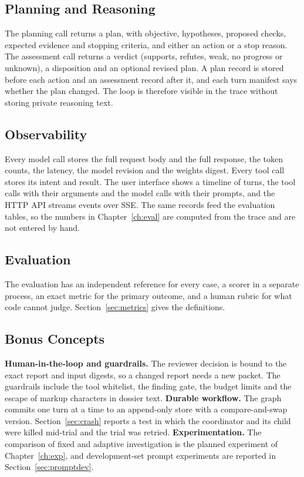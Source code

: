 \subsection{Planning and Reasoning}
The planning call returns a plan, with objective, hypotheses, proposed checks, expected evidence and
stopping criteria, and either an action or a stop reason. The assessment call returns a verdict
(supports, refutes, weak, no progress or unknown), a disposition and an optional revised plan. A plan record
is stored before each action and an assessment record after it, and each turn manifest says whether the plan
changed. The loop is therefore visible in the trace without storing private reasoning text.

\subsection{Observability}
Every model call stores the full request body and the full response, the token counts, the latency, the
model revision and the weights digest. Every tool call stores its intent and result. The user interface shows
a timeline of turns, the tool calls with their arguments and the model calls with their prompts, and the
HTTP API streams events over SSE. The same records feed the evaluation tables, so the numbers in
Chapter~\ref{ch:eval} are computed from the trace and are not entered by hand.

\subsection{Evaluation}
The evaluation has an independent reference for every case, a scorer in a separate process, an exact metric for
the primary outcome, and a human rubric for what code cannot judge. Section~\ref{sec:metrics} gives the
definitions.

\subsection{Bonus Concepts}
\textbf{Human-in-the-loop and guardrails.} The reviewer decision is bound to the exact report and input digests,
so a changed report needs a new packet. The guardrails include the tool whitelist, the finding gate,
the budget limits and the escape of markup characters in dossier text.
\textbf{Durable workflow.} The graph commits one turn at a time to an append-only store with a
compare-and-swap version. Section~\ref{sec:crash} reports a test in which the coordinator and its child were
killed mid-trial and the trial was retried.
\textbf{Experimentation.} The comparison of fixed and adaptive investigation is the planned experiment of
Chapter~\ref{ch:exp}, and development-set prompt experiments are reported in Section~\ref{sec:promptdev}.
